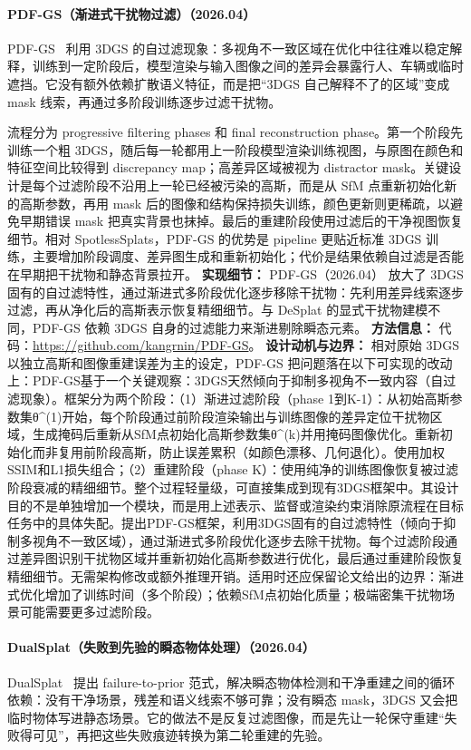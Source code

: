 \paragraph{PDF-GS（渐进式干扰物过滤）（2026.04）}
PDF-GS~\cite{2604_12580} 利用 3DGS 的自过滤现象：多视角不一致区域在优化中往往难以稳定解释，训练到一定阶段后，模型渲染与输入图像之间的差异会暴露行人、车辆或临时遮挡。它没有额外依赖扩散语义特征，而是把“3DGS 自己解释不了的区域”变成 mask 线索，再通过多阶段训练逐步过滤干扰物。

流程分为 progressive filtering phases 和 final reconstruction phase。第一个阶段先训练一个粗 3DGS，随后每一轮都用上一阶段模型渲染训练视图，与原图在颜色和特征空间比较得到 discrepancy map；高差异区域被视为 distractor mask。关键设计是每个过滤阶段不沿用上一轮已经被污染的高斯，而是从 SfM 点重新初始化新的高斯参数，再用 mask 后的图像和结构保持损失训练，颜色更新则更稀疏，以避免早期错误 mask 把真实背景也抹掉。最后的重建阶段使用过滤后的干净视图恢复细节。相对 SpotlessSplats，PDF-GS 的优势是 pipeline 更贴近标准 3DGS 训练，主要增加阶段调度、差异图生成和重新初始化；代价是结果依赖自过滤是否能在早期把干扰物和静态背景拉开。
\textbf{实现细节：} PDF-GS（2026.04） 放大了 3DGS 固有的自过滤特性，通过渐进式多阶段优化逐步移除干扰物：先利用差异线索逐步过滤，再从净化后的高斯表示恢复精细细节。与 DeSplat 的显式干扰物建模不同，PDF-GS 依赖 3DGS 自身的过滤能力来渐进剔除瞬态元素。
\textbf{方法信息：} 代码：\url{https://github.com/kangrnin/PDF-GS}。
\textbf{设计动机与边界：} 相对原始 3DGS 以独立高斯和图像重建误差为主的设定，PDF-GS 把问题落在以下可实现的改动上：PDF-GS基于一个关键观察：3DGS天然倾向于抑制多视角不一致内容（自过滤现象）。框架分为两个阶段：（1）渐进过滤阶段（phase 1到K-1）：从初始高斯参数集θ\^{}(1)开始，每个阶段通过前阶段渲染输出与训练图像的差异定位干扰物区域，生成掩码后重新从SfM点初始化高斯参数集θ\^{}(k)并用掩码图像优化。重新初始化而非复用前阶段高斯，防止误差累积（如颜色漂移、几何退化）。使用加权SSIM和L1损失组合；（2）重建阶段（phase K）：使用纯净的训练图像恢复被过滤阶段衰减的精细细节。整个过程轻量级，可直接集成到现有3DGS框架中。其设计目的不是单独增加一个模块，而是用上述表示、监督或渲染约束消除原流程在目标任务中的具体失配。提出PDF-GS框架，利用3DGS固有的自过滤特性（倾向于抑制多视角不一致区域），通过渐进式多阶段优化逐步去除干扰物。每个过滤阶段通过差异图识别干扰物区域并重新初始化高斯参数进行优化，最后通过重建阶段恢复精细细节。无需架构修改或额外推理开销。适用时还应保留论文给出的边界：渐进式优化增加了训练时间（多个阶段）；依赖SfM点初始化质量；极端密集干扰物场景可能需要更多过滤阶段。
\paragraph{DualSplat（失败到先验的瞬态物体处理）（2026.04）}
DualSplat~\cite{2604_21631} 提出 failure-to-prior 范式，解决瞬态物体检测和干净重建之间的循环依赖：没有干净场景，残差和语义线索不够可靠；没有瞬态 mask，3DGS 又会把临时物体写进静态场景。它的做法不是反复过滤图像，而是先让一轮保守重建“失败得可见”，再把这些失败痕迹转换为第二轮重建的先验。

